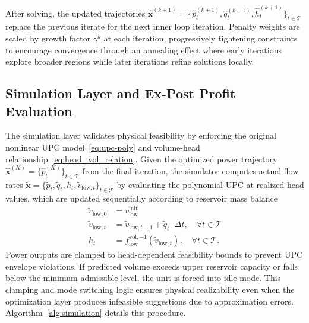 \documentclass[journal]{IEEEtran}
\begin{document}
After solving, the updated trajectories $\hat{\mathbf{x}}^{(k+1)} = \{\hat{p}_t^{(k+1)}, \hat{q}_t^{(k+1)}, \hat{h}_t^{(k+1)}\}_{t \in \mathcal{T}}$ replace the previous iterate for the next inner loop iteration. Penalty weights are scaled by growth factor $\gamma^k$ at each iteration, progressively tightening constraints to encourage convergence through an annealing effect where early iterations explore broader regions while later iterations refine solutions locally.

\subsection{Simulation Layer and Ex-Post Profit Evaluation}
\label{subsec:simulation}

The simulation layer validates physical feasibility by enforcing the original nonlinear UPC model~\eqref{eq:upc-poly} and volume-head relationship~\eqref{eq:head_vol_relation}. Given the optimized power trajectory $\hat{\mathbf{x}}^{(K)} = \{\hat{p}_t^{(K)}\}_{t \in \mathcal{T}}$ from the final iteration, the simulator computes actual flow rates $\tilde{\mathbf{x}} = \{\tilde{p}_t, \tilde{q}_t, \tilde{h}_t, \tilde{v}_{\text{low},t}\}_{t \in \mathcal{T}}$ by evaluating the polynomial UPC at realized head values, which are updated sequentially according to reservoir mass balance
\begin{align}
\tilde{v}_{\text{low},0} &= v_{\text{low}}^{\text{init}} \label{eq:sim_v0}\\
\tilde{v}_{\text{low},t} &= \tilde{v}_{\text{low},t-1} + \tilde{q}_t \cdot \Delta t, \quad \forall t \in \mathcal{T} \label{eq:sim_vt}\\
\tilde{h}_t &= f_{\text{low}}^{\text{vol},-1}(\tilde{v}_{\text{low},t}), \quad \forall t \in \mathcal{T}. \label{eq:sim_ht}
\end{align}
Power outputs are clamped to head-dependent feasibility bounds to prevent UPC envelope violations. If predicted volume exceeds upper reservoir capacity or falls below the minimum admissible level, the unit is forced into idle mode. This clamping and mode switching logic ensures physical realizability even when the optimization layer produces infeasible suggestions due to approximation errors. Algorithm~\ref{alg:simulation} details this procedure.
\end{document}
